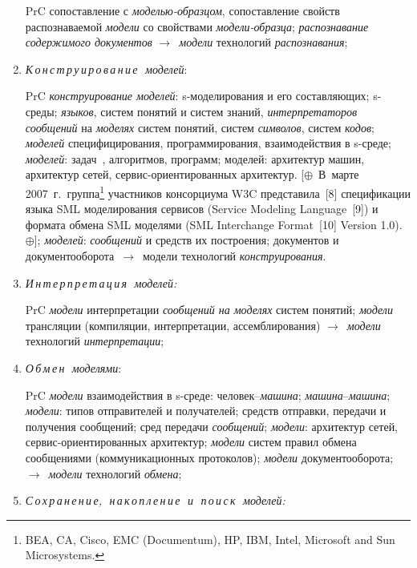 \begin{multicols}{2}
\begin{enumerate}[1.]
PrC сопоставление с \textit{моделью-образцом}, со\-по\-став\-ле\-ние свойств
распознаваемой \textit{модели} со свойствами \textit{модели-образца}; 
\textit{распознавание содержимого документов} $\rightarrow$~\textit{модели} 
технологий \textit{распознавания};
\item \textit{К\,о\,н\,с\,т\,р\,у\,и\,р\,о\,в\,а\,н\,и\,е\,\ моделей}:

PrC \textit{конструирование моделей}: s-мо\-де\-ли\-ро\-ва\-ния и его 
составляющих; s-сре\-ды; \textit{языков}, систем понятий и систем знаний, 
\textit{интерпретаторов сообщений} на \textit{моделях} сис\-тем понятий, систем 
\textit{символов}, систем \textit{кодов}; \textit{моделей} специфицирования, 
программирования, взаимодействия в s-сре\-де; \textit{моделей}: 
задач~\cite{7il}, алгоритмов, программ; моделей: архитектур машин, архитектур 
сетей, сер\-вис-ори\-ен\-ти\-ро\-ван\-ных архитектур. [$\oplus$~В~марте 
2007~г.\ группа\footnote[2]{BEA, CA, Cisco, EMC (Documentum), HP, IBM, Intel, 
Microsoft and Sun Microsystems.} участников консорциума W3C представила~[8] 
спецификации языка SML моделирования сервисов (Service Modeling Language~[9]) и 
формата обмена SML моделями (SML Interchange Format~[10] Version 
1.0).~$\oplus$]; \textit{моделей}: \textit{сообщений} и средств их построения; 
документов и документооборота~$\rightarrow$~модели технологий 
\textit{конструирования}.
\item \textit{И\,н\,т\,е\,р\,п\,р\,е\,т\,а\,ц\,и\,я\,\ моделей:}

PrC \textit{модели} интерпретации \textit{сообщений на моделях} систем понятий;
\textit{модели} трансляции (компиляции, интерпретации, ассемблирования)
$\rightarrow$~\textit{модели} технологий \textit{интерпретации};
\item \textit{О\,б\,м\,е\,н\,\ моделями}:

PrC \textit{модели} взаимодействия в s-среде: че\-ло\-век--\textit{ма\-ши\-на};
\textit{ма\-ши\-на}--\textit{ма\-ши\-на}; \textit{модели}: типов отправителей и
получателей; средств отправки, пере\-да\-чи и получения сообщений; сред 
передачи \textit{сооб\-ще\-ний}; \textit{модели}: архитектур сетей, 
сервис-ори\-ен\-ти\-ро\-ван\-ных архитектур; \textit{модели} сис\-тем правил 
обмена сообщениями (коммуникационных протоколов); \textit{модели} 
документооборота; $\rightarrow$~\textit{модели} технологий \textit{обмена};
\item \textit{С\,о\,х\,р\,а\,н\,е\,н\,и\,е,\,\ н\,а\,к\,о\,п\,л\,е\,н\,и\,е\,\ 
и\,\ п\,о\,и\,с\,к\,\ моделей:}


\end{enumerate}
\end{multicols}
